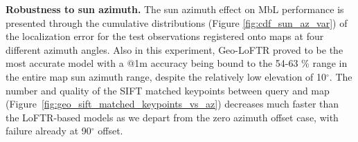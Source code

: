 \noindent \textbf{Robustness to sun azimuth.}
The sun azimuth effect on MbL performance is presented through the cumulative distributions  (Figure \ref{fig:cdf_sun_az_var}) of the localization error for the test observations registered onto maps at four different  azimuth angles. Also in this experiment, Geo-LoFTR proved to be the most accurate model with a @1m accuracy being bound to the 54-63 \% range in the entire map sun azimuth range, despite the relatively low elevation of 10$^{\circ}$. The number and quality of the SIFT matched keypoints between query and map (Figure~\ref{fig:geo_sift_matched_keypoints_vs_az}) decreases much faster than the LoFTR-based models as we depart from the zero azimuth offset case, with failure already at 90$^{\circ}$ offset.


